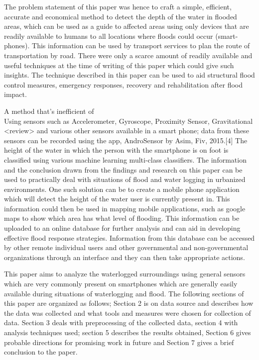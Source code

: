 \documentclass[conference]{IEEEtran}
\begin{document}
The problem statement of this paper was hence to craft a simple, efficient, accurate and economical method to detect the depth of the water in flooded areas, which can be used as a guide to affected areas using only devices that are readily available to humans to all locations where floods could occur (smart-phones). This information can be used by transport services to plan the route of transportation by road. There were only a scarce amount of readily available and useful techniques at the time of writing of this paper which could give such insights. The technique described in this paper can be used to aid structural flood control measures, emergency responses, recovery and rehabilitation after flood impact. 

A method that’s inefficient of \\%
Using sensors such as Accelerometer, Gyroscope, Proximity Sensor, Gravitational <review> and various other sensors available in a smart phone; data from these sensors can be recorded using the app, AndroSensor by Asim, Fiv, 2015.[4] The height of the water in which the person with the smartphone is on foot is classified using various machine learning multi-class classifiers. The information and the conclusion drawn from the findings and research on this paper can be used to practically deal with situations of flood and water logging in urbanized environments. One such solution can be to create a mobile phone application which will detect the height of the water user is currently present in. This information could then be used in mapping mobile applications, such as google maps to show which area has what level of flooding. This information can be uploaded to an online database for further analysis and can aid in developing effective flood response strategies. Information from this database can be accessed by other remote individual users and other governmental and non-governmental organizations through an interface and they can then take appropriate actions. 

This paper aims to analyze the waterlogged surroundings using general sensors which are very commonly present on smartphones which are generally easily available during situations of waterlogging and flood.  
The following sections of this paper are organized as follows; Section 2 is on data source and describes how the data was collected and what tools and measures were chosen for collection of data. Section 3 deals with preprocessing of the collected data, section 4 with analysis techniques used; section 5 describes the results obtained, Section 6 gives probable directions for promising work in future and Section 7 gives a brief conclusion to the paper.%
\end{document}
